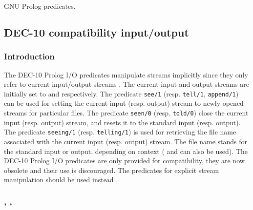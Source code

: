 \begin{PlErrors}


 

 


\end{PlErrors}

\Portability

GNU Prolog predicates.

\subsection{DEC-10 compatibility input/output}

\subsubsection{Introduction}
The DEC-10 Prolog I/O predicates manipulate streams implicitly since they
only refer to current input/output streams .
The current input and output streams are initially set to
 and  respectively. The predicate
\texttt{see/1}
(resp. \texttt{tell/1}, \texttt{append/1}) can be used for setting the
current input (resp. output) stream to newly opened streams for
particular files. The predicate \texttt{seen/0}
(resp. \texttt{told/0}) close the current input (resp. output) stream,
and resets it to the standard input (resp. output). The predicate
\texttt{seeing/1} (resp. \texttt{telling/1}) is used for retrieving
the file name associated with the current input (resp. output)
stream. The file name  stands for the standard input or
output, depending on context ( and
 can also be used). The DEC-10 Prolog I/O predicates
are only provided for compatibility, they are now obsolete and
their use is discouraged. The predicates for explicit stream manipulation
should be used instead .

\subsubsection{,
               ,
               }

